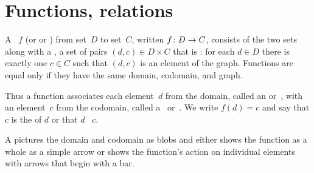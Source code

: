 \documentclass{ibl}  %
\begin{document}











\chapter{Functions, relations}
\begin{df}
A ~$f$ (or  or ) 
from  set~$D$
to  set~$C$, written $\mbox{$f\colon D\to C$}$,
consists of the two sets along with a , 
a set of pairs $(d,c)\in D\times C$ that is 
: for each $d\in D$ there is
exactly one $c\in C$ such that $(d,c)$ is an element of the graph. 
Functions are equal only if they have the same domain, codomain,
and graph.
\end{df}

\noindent Thus a function associates each element~$d$ from the domain,
called an  or~,
with an element~$c$ from the codomain, 
called a~ or~. 
We write $f(d)=c$ and say that $c$ is the  of $d$ 
or that $d$ ~$c$.

A  pictures the domain and 
codomain as blobs and 
either shows the function as a whole as a simple arrow   
or shows the function's action on individual elements 
with arrows that begin with a bar.
\begin{center}
  \hspace{8em}
\end{center}
\end{document}
